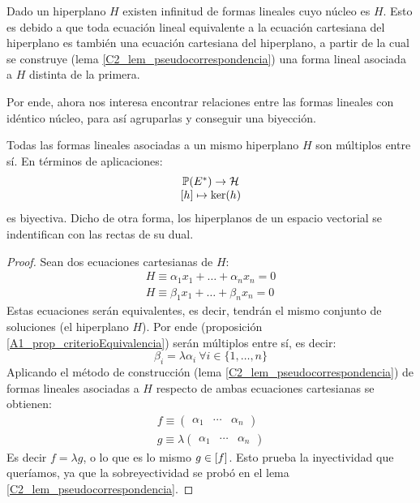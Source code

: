 Dado un hiperplano $H$ existen infinitud de formas lineales cuyo núcleo es $H$. Esto es debido a que toda ecuación lineal equivalente a la ecuación cartesiana del hiperplano es también una ecuación cartesiana del hiperplano, a partir de la cual se construye (lema \ref{C2_lem_pseudocorrespondencia}) una forma lineal asociada a $H$ distinta de la primera.

Por ende, ahora nos interesa encontrar relaciones entre las formas lineales con idéntico núcleo, para así agruparlas y conseguir una biyección.

\begin{lem}
	\label{C2_lem_correspondencia}
	Todas las formas lineales asociadas a un mismo hiperplano $H$ son múltiplos entre sí. En términos de aplicaciones:
	\[\begin{array}{c}
	\mathbb{P}(E^*)\to\mathcal{H}\\
	\left [ h \right ]\mapsto \ker(h)
	\end{array}
	\]
	es biyectiva. Dicho de otra forma, los hiperplanos de un espacio vectorial se indentifican con las rectas de su dual.
\end{lem}
\begin{proof}
	Sean dos ecuaciones cartesianas de $H$:
	\begin{gather}
		H\equiv \alpha_1x_1+\dots+\alpha_nx_n=0\\
		H\equiv \beta_1x_1+\dots+\beta_nx_n=0
	\end{gather}
	Estas ecuaciones serán equivalentes, es decir, tendrán el mismo conjunto de soluciones (el hiperplano $H$). Por ende (proposición \ref{A1_prop_criterioEquivalencia}) serán múltiplos entre sí, es decir:
	\begin{equation}
		\beta_i = \lambda\alpha_i\ \forall i\in\{1,\dots,n\}
	\end{equation}
	Aplicando el método de construcción (lema \ref{C2_lem_pseudocorrespondencia}) de formas lineales asociadas a $H$ respecto de ambas ecuaciones cartesianas se obtienen:
	\begin{gather}
		f\equiv\begin{pmatrix}
			\alpha_1 & \cdots & \alpha_n
		\end{pmatrix}\\
		g\equiv\lambda\begin{pmatrix}
			\alpha_1 & \cdots & \alpha_n
		\end{pmatrix}
	\end{gather}
	Es decir $f=\lambda g$, o lo que es lo mismo $g\in\left [ f \right ]$. Esto prueba la inyectividad que queríamos, ya que la sobreyectividad se probó en el lema \ref{C2_lem_pseudocorrespondencia}.
\end{proof}

